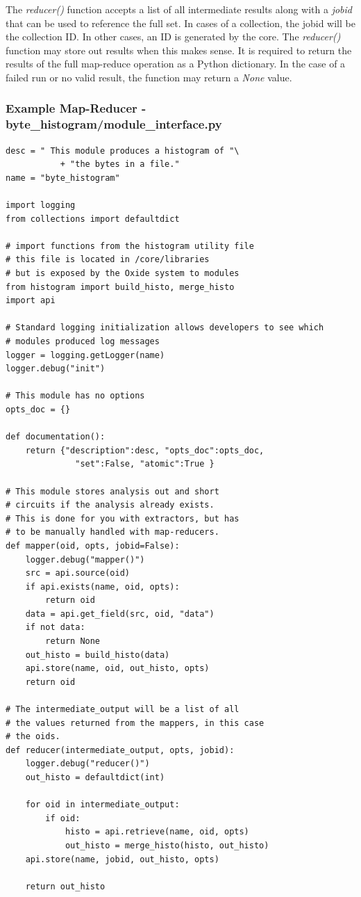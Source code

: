 \documentclass{book}
\begin{document}
The \emph{reducer()} function accepts a list of all intermediate results along with a \emph{jobid} that can be used to reference the full set.  In cases of a collection, the jobid will be the collection ID.  In other cases, an ID is generated by the core.  The \emph{reducer()} function may store out results when this makes sense.  It is required to return the results of the full map-reduce operation as a Python dictionary.  In the case of a failed run or no valid result, the function may return a \emph{None} value.

\subsubsection{Example Map-Reducer - byte\_histogram/module\_interface.py}
\begin{verbatim}
desc = " This module produces a histogram of "\
           + "the bytes in a file." 
name = "byte_histogram"        

import logging
from collections import defaultdict

# import functions from the histogram utility file
# this file is located in /core/libraries
# but is exposed by the Oxide system to modules
from histogram import build_histo, merge_histo
import api

# Standard logging initialization allows developers to see which
# modules produced log messages
logger = logging.getLogger(name)
logger.debug("init")

# This module has no options
opts_doc = {} 
   
def documentation():
    return {"description":desc, "opts_doc":opts_doc, 
              "set":False, "atomic":True }

# This module stores analysis out and short 
# circuits if the analysis already exists.
# This is done for you with extractors, but has
# to be manually handled with map-reducers.
def mapper(oid, opts, jobid=False):
    logger.debug("mapper()")
    src = api.source(oid)
    if api.exists(name, oid, opts):
        return oid
    data = api.get_field(src, oid, "data")
    if not data:
        return None
    out_histo = build_histo(data)
    api.store(name, oid, out_histo, opts)
    return oid

# The intermediate_output will be a list of all
# the values returned from the mappers, in this case
# the oids.        
def reducer(intermediate_output, opts, jobid):
    logger.debug("reducer()")
    out_histo = defaultdict(int)

    for oid in intermediate_output:
        if oid:
            histo = api.retrieve(name, oid, opts)
            out_histo = merge_histo(histo, out_histo)
    api.store(name, jobid, out_histo, opts)
    
    return out_histo          
\end{verbatim}
\end{document}

